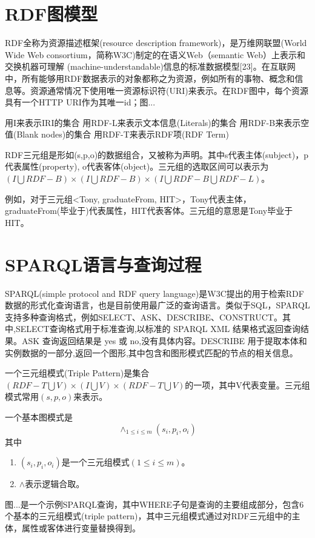 \section{RDF图模型}

RDF全称为资源描述框架(resource description framework)，是万维网联盟(World Wide Web consortium，简称W3C)制定的在语义Web（semantic Web）上表示和交换机器可理解
(machine-understandable)信息的标准数据模型[23]。在互联网中，所有能够用RDF数据表示的对象都称之为资源，例如所有的事物、概念和信息等。资源通常情况下使用唯一资源标识符(URI)来表示。在RDF图中，每个资源具有一个HTTP URI作为其唯一id；图...

 \begin{definition}    
    用I来表示IRI的集合
    用RDF-L来表示文本信息(Literals)的集合
    用RDF-B来表示空值(Blank nodes)的集合
    用RDF-T来表示RDF项(RDF Term)
\end{definition}

\begin{definition}[（RDF三元组）]    
    RDF三元组是形如(s,p,o)的数据组合，又被称为声明。其中s代表主体(subject)，p代表属性(property),
    o代表客体(object)。三元组的选取区间可以表示为$(I\bigcup RDF-B)\times(I\bigcup RDF-B)\times(I\bigcup RDF-B\bigcup RDF-L)$。
    
    例如，对于三元组<Tony, graduateFrom, HIT>，Tony代表主体，graduateFrom(毕业于)代表属性，HIT代表客体。三元组的意思是Tony毕业于HIT。
\end{definition}

\section{SPARQL语言与查询过程}

SPARQL(simple protocol and RDF query language)是W3C提出的用于检索RDF数据的形式化查询语言，也是目前使用最广泛的查询语言。类似于SQL，SPARQL支持多种查询格式，例如SELECT、ASK、DESCRIBE、CONSTRUCT。其中,SELECT查询格式用于标准查询,以标准的 SPARQL XML 结果格式返回查询结果。ASK 查询返回结果是 yes 或 no,没有具体内容。DESCRIBE 用于提取本体和实例数据的一部分,返回一个图形,其中包含和图形模式匹配的节点的相关信息。
\begin{definition}[（三元组模式）] 
    \label{Triple}   
    一个三元组模式(Triple Pattern)是集合$(RDF-T \bigcup V)\times(I \bigcup V)\times(RDF-T \bigcup V)$的一项，其中V代表变量。三元组模式常用$(s,p,o)$来表示。
\end{definition}
\begin{definition}    
    \label{BGP}
    一个基本图模式是$$\wedge_{1\leqslant i\leqslant m}(s_i,p_i,o_i)$$
    其中
    \begin{enumerate}
        \item $(s_i,p_i,o_i)$是一个三元组模式$(1 \leqslant  i \leqslant m)$。
        \item $\wedge$表示逻辑合取。
    \end{enumerate}
    
\end{definition}
图...是一个示例SPARQL查询，其中WHERE子句是查询的主要组成部分，包含6个基本的三元组模式(triple pattern)，其中三元组模式通过对RDF三元组中的主体，属性或客体进行变量替换得到。

